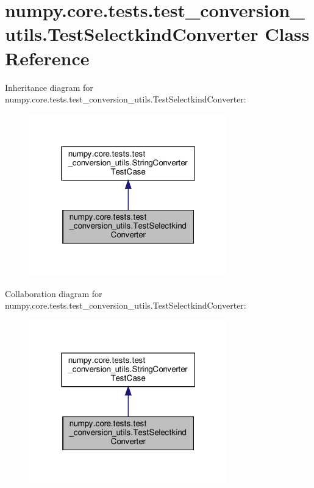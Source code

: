 \hypertarget{classnumpy_1_1core_1_1tests_1_1test__conversion__utils_1_1TestSelectkindConverter}{}\section{numpy.\+core.\+tests.\+test\+\_\+conversion\+\_\+utils.\+Test\+Selectkind\+Converter Class Reference}
\label{classnumpy_1_1core_1_1tests_1_1test__conversion__utils_1_1TestSelectkindConverter}


Inheritance diagram for numpy.\+core.\+tests.\+test\+\_\+conversion\+\_\+utils.\+Test\+Selectkind\+Converter\+:
\nopagebreak
\begin{figure}[H]
\begin{center}
\leavevmode
\includegraphics[width=244pt]{classnumpy_1_1core_1_1tests_1_1test__conversion__utils_1_1TestSelectkindConverter__inherit__graph}
\end{center}
\end{figure}


Collaboration diagram for numpy.\+core.\+tests.\+test\+\_\+conversion\+\_\+utils.\+Test\+Selectkind\+Converter\+:
\nopagebreak
\begin{figure}[H]
\begin{center}
\leavevmode
\includegraphics[width=244pt]{classnumpy_1_1core_1_1tests_1_1test__conversion__utils_1_1TestSelectkindConverter__coll__graph}
\end{center}
\end{figure}
